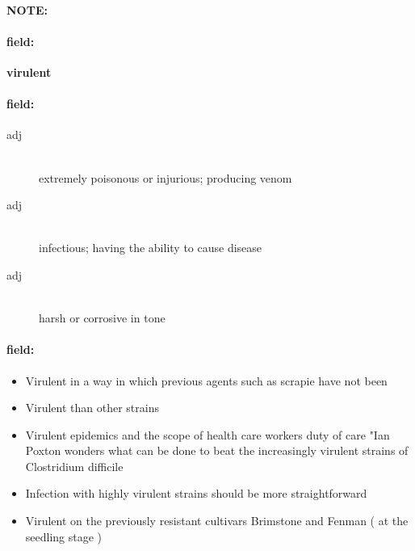 \documentclass[12pt]{article}
\newenvironment{note}{\paragraph{NOTE:}}{}
\newenvironment{field}{\paragraph{field:}}{}
\begin{document}
\begin{note}
\begin{field}
\textbf{\large virulent}
\end{field}


\begin{field}
\begin{description}
\item[adj] \hfill \\ 
extremely poisonous or injurious; producing venom

\item[adj] \hfill \\ 
infectious; having the ability to cause disease

\item[adj] \hfill \\ 
harsh or corrosive in tone

\end{description}
\end{field}

\begin{field}
\begin{itemize}
\item Virulent in a way in which previous agents such as scrapie have not been
\item Virulent than other strains
\item Virulent epidemics and the scope of health care workers duty of care "Ian Poxton wonders what can be done to beat the increasingly virulent strains of Clostridium difficile
\item Infection with highly virulent strains should be more straightforward
\item Virulent on the previously resistant cultivars Brimstone and Fenman ( at the seedling stage )
\end{itemize}
\end{field}
\end{note}
\end{document}
